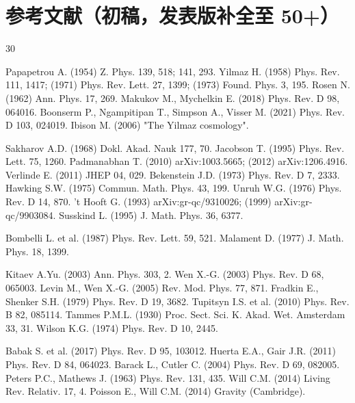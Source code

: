 \documentclass[UTF8,fontset=windows]{csoarticle}
\begin{document}
\section*{参考文献（初稿，发表版补全至 50+）}
\begin{thebibliography}{30}

 Papapetrou A. (1954) Z. Phys. 139, 518; 141, 293. 
 Yilmaz H. (1958) Phys. Rev. 111, 1417; (1971) Phys. Rev. Lett. 27, 1399; (1973) Found. Phys. 3, 195. 
 Rosen N. (1962) Ann. Phys. 17, 269. 
 Makukov M., Mychelkin E. (2018) Phys. Rev. D 98, 064016. 
 Boonserm P., Ngampitipan T., Simpson A., Visser M. (2021) Phys. Rev. D 103, 024019. 
 Ibison M. (2006) "The Yilmaz cosmology".

 Sakharov A.D. (1968) Dokl. Akad. Nauk 177, 70. 
 Jacobson T. (1995) Phys. Rev. Lett. 75, 1260. 
 Padmanabhan T. (2010) arXiv:1003.5665; (2012) arXiv:1206.4916. 
 Verlinde E. (2011) JHEP 04, 029. 
 Bekenstein J.D. (1973) Phys. Rev. D 7, 2333. 
 Hawking S.W. (1975) Commun. Math. Phys. 43, 199. 
 Unruh W.G. (1976) Phys. Rev. D 14, 870. 
 't Hooft G. (1993) arXiv:gr-qc/9310026; (1999) arXiv:gr-qc/9903084. 
 Susskind L. (1995) J. Math. Phys. 36, 6377.

 Bombelli L. et al. (1987) Phys. Rev. Lett. 59, 521. 
 Malament D. (1977) J. Math. Phys. 18, 1399.

 Kitaev A.Yu. (2003) Ann. Phys. 303, 2. 
 Wen X.-G. (2003) Phys. Rev. D 68, 065003. 
 Levin M., Wen X.-G. (2005) Rev. Mod. Phys. 77, 871. 
 Fradkin E., Shenker S.H. (1979) Phys. Rev. D 19, 3682. 
 Tupitsyn I.S. et al. (2010) Phys. Rev. B 82, 085114. 
 Tammes P.M.L. (1930) Proc. Sect. Sci. K. Akad. Wet. Amsterdam 33, 31. 
 Wilson K.G. (1974) Phys. Rev. D 10, 2445.

 Babak S. et al. (2017) Phys. Rev. D 95, 103012. 
 Huerta E.A., Gair J.R. (2011) Phys. Rev. D 84, 064023. 
 Barack L., Cutler C. (2004) Phys. Rev. D 69, 082005. 
 Peters P.C., Mathews J. (1963) Phys. Rev. 131, 435. 
 Will C.M. (2014) Living Rev. Relativ. 17, 4. 
 Poisson E., Will C.M. (2014) Gravity (Cambridge).



\end{thebibliography}
\end{document}
